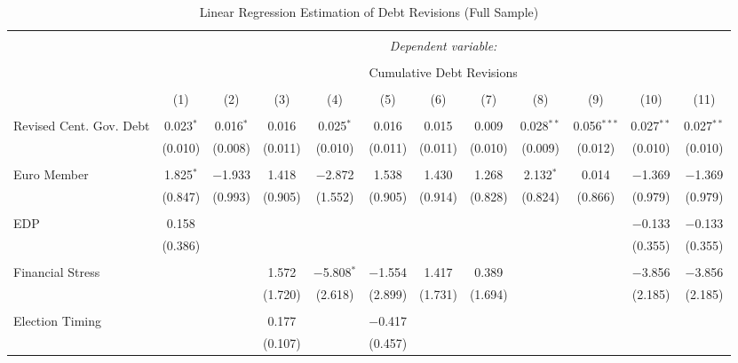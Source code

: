 
\begin{table}[!htbp] \centering 
  \caption{Linear Regression Estimation of Debt Revisions (Full Sample)} 
  \label{debt_results} 
\tiny 
\begin{tabular}{@{\extracolsep{5pt}}lccccccccccc} 
\\[-1.8ex]\hline 
\hline \\[-1.8ex] 
 & \multicolumn{11}{c}{\textit{Dependent variable:}} \\ 
\cline{2-12} 
\\[-1.8ex] & \multicolumn{11}{c}{Cumulative Debt Revisions} \\ 
\\[-1.8ex] & (1) & (2) & (3) & (4) & (5) & (6) & (7) & (8) & (9) & (10) & (11)\\ 
\hline \\[-1.8ex] 
 Revised Cent. Gov. Debt & 0.023$^{*}$ & 0.016$^{*}$ & 0.016 & 0.025$^{*}$ & 0.016 & 0.015 & 0.009 & 0.028$^{**}$ & 0.056$^{***}$ & 0.027$^{**}$ & 0.027$^{**}$ \\ 
  & (0.010) & (0.008) & (0.011) & (0.010) & (0.011) & (0.011) & (0.010) & (0.009) & (0.012) & (0.010) & (0.010) \\ 
  & & & & & & & & & & & \\ 
 Euro Member & 1.825$^{*}$ & $-$1.933 & 1.418 & $-$2.872 & 1.538 & 1.430 & 1.268 & 2.132$^{*}$ & 0.014 & $-$1.369 & $-$1.369 \\ 
  & (0.847) & (0.993) & (0.905) & (1.552) & (0.905) & (0.914) & (0.828) & (0.824) & (0.866) & (0.979) & (0.979) \\ 
  & & & & & & & & & & & \\ 
 EDP & 0.158 &  &  &  &  &  &  &  &  & $-$0.133 & $-$0.133 \\ 
  & (0.386) &  &  &  &  &  &  &  &  & (0.355) & (0.355) \\ 
  & & & & & & & & & & & \\ 
 Financial Stress &  &  & 1.572 & $-$5.808$^{*}$ & $-$1.554 & 1.417 & 0.389 &  &  & $-$3.856 & $-$3.856 \\ 
  &  &  & (1.720) & (2.618) & (2.899) & (1.731) & (1.694) &  &  & (2.185) & (2.185) \\ 
  & & & & & & & & & & & \\ 
 Election Timing &  &  & 0.177 &  & $-$0.417 &  &  &  &  &  &  \\ 
  &  &  & (0.107) &  & (0.457) &  &  &  &  &  &  \\ 

\end{tabular}
\end{table}
